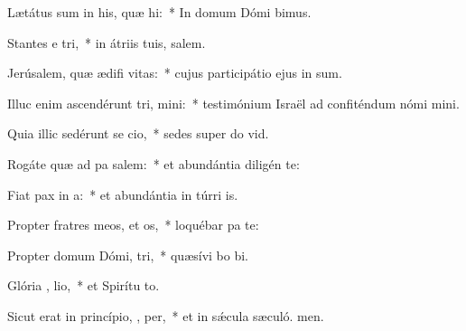 \item Lætátus sum in his, quæ   hi:~* In domum Dómi bimus.
\item Stantes e  tri,~* in átriis tuis, salem.
\item Jerúsalem, quæ ædifi  vitas:~* cujus participátio ejus in sum.
\item Illuc enim ascendérunt tri,  mini:~* testimónium Israël ad confiténdum nómi mini.
\item Quia illic sedérunt se  cio,~* sedes super do vid.
\item Rogáte quæ ad pa  salem:~* et abundántia diligén te:
\item Fiat pax in  a:~* et abundántia in túrri is.
\item Propter fratres meos, et  os,~* loquébar pa  te:
\item Propter domum Dómi,  tri,~* quæsívi bo bi.
\item Glória ,  lio,~* et Spirítu to.
\item Sicut erat in princípio,  ,  per,~* et in sǽcula sæculó. men.
